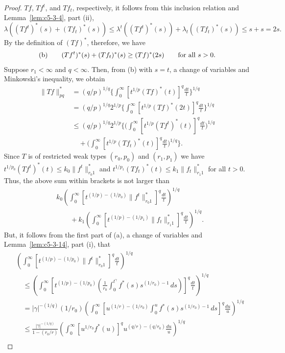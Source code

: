 \begin{proof}
$Tf$, $Tf^{t}$, and $Tf_{t}$, respectively, it follows from this inclusion
relation and Lemma~\ref{lem:c5-3-4}, part (ii),
\[
\lambda((Tf^{t})^{*}(s)+(Tf_{t})^{*}(s))\leq
\lambda^{t}((Tf^{t})^{*}(s))+\lambda_{t}((Tf_{t})^{*}(s))\leq s+s=2s.
\]
By the definition of $(Tf)^{*}$, therefore, we have
\[
\textup{(b)}\qquad
(Tf^{t})^{*}(s)+(Tf_{t})^{*}(s)\geq(Tf)^{*}(2s)\qquad\text{for all } s>0.
\]
Suppose $r_{1} < \infty$ and $q < \infty$. Then, from (b) with $s = t$, a
change of variables and Minkowski's inequality, we obtain
\begin{align*}
\|Tf\|_{pq}^{*}&=(q/p)^{1/q}\Biggl\{\int_{0}^{\infty}[t^{1/p}(Tf)^{*}(t)]^{q}\frac{dt}{t}\Biggr\}^{1/q}\\
&=(q/p)^{1/q}2^{1/p}\Biggl\{\int_{0}^{\infty}[t^{1/p}(Tf)^{*}(2t)]^{q}\frac{dt}{t}\Biggr\}^{1/q}\\
&\leq(q/p)^{1/q}2^{1/p}\Biggl\{\Biggl(\int_{0}^{\infty}[t^{1/p}(Tf^{t})^{*}(t)]^{q}\frac{dt}{t}\Biggr)^{1/q}\\
&\quad+\Biggl(\int_{0}^{\infty}[t^{1/p}(Tf_{t})^{*}(t)]^{q}\frac{dt}{t}\Biggr)^{1/q}\Biggr\}.
\end{align*}
Since $T$ is of restricted weak types $(r_{0}, p_{0})$ and $(r_{1}, p_{1})$ we
have $t^{1/p_{0}}(Tf^{t})^{*}(t) \leq k_{0}\|f^{t}\|_{r_{0}1}^{*}$ and
$t^{1/p_{1}}(Tf_{t})^{*}(t) \leq k_{1}\|f_{t}\|_{r_{1}1}^{*}$ for all $t > 0$.
Thus, the above sum within brackets is not larger than
\[
\begin{aligned}&k_{0}\left(\int_{0}^{\infty}[t^{(1/p)-(1/p_{0})}\|f^{t}\|_{r_{0}1}^{*}]^{q}\frac{dt}{t}\right)^{1/q}\\
&\qquad+k_{1}\left(\int_{0}^{\infty}[t^{(1/p)-(1/p_{1})}\|f_{t}\|_{r_{1}1}^{*}]^{q}\frac{dt}{t}\right)^{1/q}.\end{aligned}
\]
But, it follows from the first part of (a), a change of variables and
Lemma~\ref{lem:c5-3-14}, part (i), that
\begin{align*}
&\left(\int_{0}^{\infty}[t^{(1/p)-(1/p_{0})}\|f^{t}\|_{r_{0}1}^{*}]^{q}\frac{dt}{t}\right)^{1/q}\\
&\quad\leq\left(\int_{0}^{\infty}\left[t^{(1/p)-(1/p_{0})}\left(\frac{1}{r_{0}}\int_{0}^{t^{\gamma}}f^{*}(s)s^{(1/r_{0})-1}\,ds\right)\right]^{q}\frac{dt}{t}\right)^{1/q}\\
&\quad=|\gamma|^{-(1/q)}(1/r_{0})\left(\int_{0}^{\infty}\left[u^{(1/r)-(1/r_{0})}\int_{0}^{u}f^{*}(s)s^{(1/r_{0})-1}\,ds\right]^{q}\frac{du}{u}\right)^{1/q}\\
&\quad\leq\frac{|\gamma|^{-(1/q)}}{1-(r_{0}/r)}
\left(\int_{0}^{\infty}[u^{1/r_{0}}f^{*}(u)]^{q}u^{(q/r)-(q/r_{0})}\frac{du}{u}\right)^{1/q}\\

\end{align*}
\end{proof}
